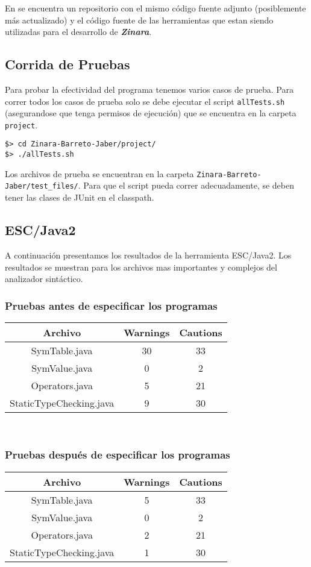 \documentclass[12pt, spanish]{report}
\begin{document}
En \cite{github} se encuentra un repositorio con el mismo c\'odigo
fuente adjunto (posiblemente m\'as actualizado) y el c\'odigo fuente de
las herramientas que estan siendo utilizadas para el desarrollo de
\emph{\textbf{Zinara}}.

\subsection{Corrida de Pruebas}
\label{sec:pruebas}
Para probar la efectividad del programa tenemos varios casos de
prueba. Para correr todos los casos de prueba solo se debe ejecutar el
script \texttt{allTests.sh} (asegurandose que tenga permisos de
ejecuci\'on) que se encuentra en la carpeta \texttt{project}.

\begin{verbatim}
$> cd Zinara-Barreto-Jaber/project/
$> ./allTests.sh
\end{verbatim}

Los archivos de prueba se encuentran en la carpeta
\texttt{Zinara-Barreto-Jaber/test\_files/}.
Para que el script pueda correr adecuadamente, se deben tener las clases
de JUnit en el classpath. 

\subsection{ESC/Java2}
\label{sec:escjava}
A continuaci\'on presentamos los resultados de la herramienta
ESC/Java2. Los resultados se muestran para los archivos mas importantes
y complejos del analizador sint\'actico.\\

\subsubsection{Pruebas antes de especificar los programas}
\begin{tabular}{|c||cc|}
\hline
Archivo                 & Warnings & Cautions  \\
\hline \hline
SymTable.java           & 30  & 33 \\
SymValue.java           & 0   & 2  \\
Operators.java          & 5   & 21 \\
StaticTypeChecking.java & 9   & 30 \\
	\hline
\end{tabular}\\

\subsubsection{Pruebas despu\'es de especificar los programas}
\begin{tabular}{|c||cc|}
\hline
Archivo                 & Warnings & Cautions  \\
\hline \hline
SymTable.java           & 5   & 33 \\
SymValue.java           & 0   & 2  \\
Operators.java          & 2   & 21 \\
StaticTypeChecking.java & 1   & 30 \\
	\hline
\end{tabular}\\
\end{document}

